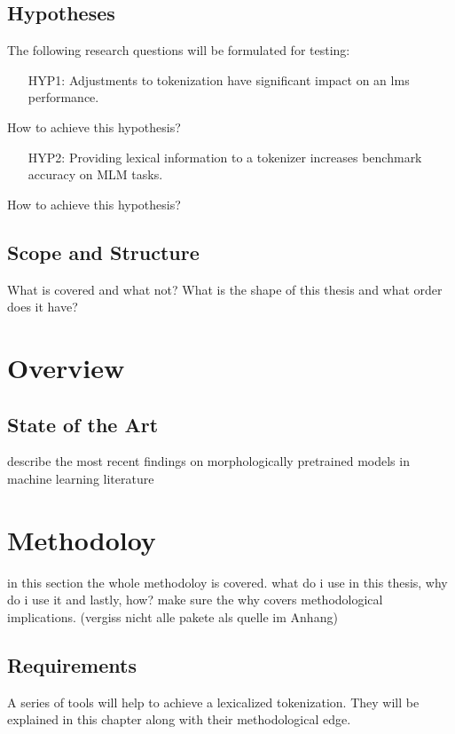 \documentclass[english]{ttlab-qualify}
\begin{document}
    \section{Hypotheses}
    The following research questions will be formulated for testing:
    \begin{framed}
        \begin{itemize}[itemindent=1em]
            \item[HYP1:] Adjustments to tokenization have significant impact on an \ac{lm}s performance.
        \end{itemize}
    \end{framed}
    How to achieve this hypothesis?
    \begin{framed}
        \begin{itemize}[itemindent=1em]
        \item[HYP2:] Providing lexical information to a tokenizer increases benchmark accuracy on MLM tasks.
    \end{itemize}
    \end{framed}
    How to achieve this hypothesis?

    \section{Scope and Structure}
    What is covered and what not?
    What is the shape of this thesis and what order does it have?

    \chapter{Overview}
    \section{State of the Art}
    describe the most recent findings on morphologically pretrained models in machine learning literature

    \chapter{Methodoloy}
    in this section the whole methodoloy is covered. what do i use in this thesis, why do i use it and lastly, how?
    make sure the why covers methodological implications. (vergiss nicht alle pakete als quelle im Anhang)

    \section{Requirements}
    A series of tools will help to achieve a lexicalized tokenization.
    They will be explained in this chapter along with their methodological edge.
\end{document}
